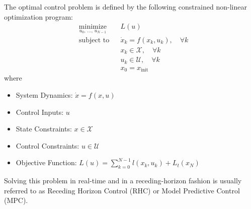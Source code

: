 \documentclass[letterpaper, 10 pt, conference]{ieeeconf}  %
\begin{document}
	The optimal control problem is defined by the following constrained non-linear optimization program:
	\begin{equation}
		\begin{aligned}
			& \underset{u_0,\,\ldots,\,u_{N-1}}{\text{minimize}}
			& & L(u) \\
			& \text{subject to}
			& & \dot{x}_k = f(x_k, u_k), \quad \forall k \\
			& & & x_k \in \mathcal{X}, \quad \forall k \\
			& & & u_k \in \mathcal{U}, \quad \forall k \\
			& & & x_0 = x_{\text{init}}
		\end{aligned}
	\end{equation}
	where
	\begin{itemize}
		\item System Dynamics: $\dot{x} = f(x, u)$
		\item Control Inputs: $u$
		\item State Constraints: $x \in \mathcal{X}$
		\item Control Constraints: $u \in \mathcal{U}$
		\item Objective Function: $L(u) = \sum_{k=0}^{N-1} l(x_k, u_k) + L_t(x_N)$
	\end{itemize}
	Solving this problem in real-time and in a receding-horizon fashion is usually referred to as Receding Horizon Control (RHC) or Model Predictive Control (MPC). 
	
\end{document}
